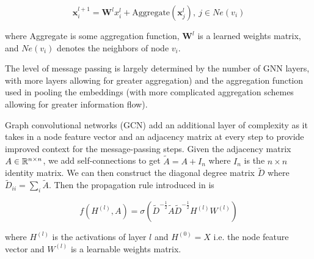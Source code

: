 \begin{equation}
\pmb{x}_i^{l+1} = \pmb{W}^{l}x_i^{l} + \text{Aggregate}(\pmb{x}_j^{l}),\ j \in Ne(v_i)
\end{equation}

where Aggregate is some aggregation function, $\pmb{W}^{l}$ is a learned weights matrix, and $Ne(v_i)$ denotes the neighbors of node $v_i$.

The level of message passing is largely determined by the number of GNN layers, with more layers allowing for greater aggregation) and the aggregation function used in pooling the embeddings (with more complicated aggregation schemes allowing for greater information flow).

Graph convolutional networks (GCN) add an additional layer of complexity as it takes in a node feature vector and an adjacency matrix at every step to provide improved context for the message-passing steps. Given the adjacency matrix $A \in \mathbb{R}^{n \times n}$, we add self-connections to get $\tilde{A} = A + I_n$ where $I_n$ is the $n \times n$ identity matrix. We can then construct the diagonal degree matrix $\tilde{D}$ where $\tilde{D}_{ii} = \sum_i\tilde{A}$. Then the propagation rule introduced in \cite{Kipf2017} is

\begin{equation}
f(H^{(l)}, A) = \sigma(\tilde{D}^{-\frac{1}{2}}\tilde{A}\tilde{D}^{-\frac{1}{2}}H^{(l)}W^{(l)})
\end{equation}

where $H^{(l)}$ is the activations of layer $l$ and $H^{(0)} = X$ i.e. the node feature vector and $W^{(l)}$ is a learnable weights matrix.

